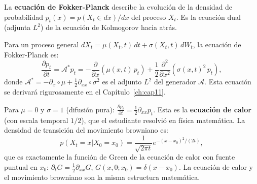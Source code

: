 La \textbf{ecuación de Fokker-Planck} describe la evolución de la densidad
de probabilidad $p_t(x) = p(X_t \in dx)/dx$ del proceso $X_t$. Es la ecuación
dual (adjunta $L^2$) de la ecuación de Kolmogorov hacia atrás.

Para un proceso general $dX_t = \mu(X_t,t)\,dt + \sigma(X_t,t)\,dW_t$,
la ecuación de Fokker-Planck es:
\begin{equation}
  \frac{\partial p_t}{\partial t}
  = \mathcal{A}^* p_t
  = -\frac{\partial}{\partial x}(\mu(x,t)\,p_t)
  + \frac{1}{2}\frac{\partial^2}{\partial x^2}(\sigma(x,t)^2\,p_t),
  \label{eq:fp}
\end{equation}
donde $\mathcal{A}^* = -\partial_x \circ \mu + \frac{1}{2}\partial_{xx}
\circ \sigma^2$ es el adjunto $L^2$ del generador $\mathcal{A}$. Esta
ecuación se derivará rigurosamente en el Capítulo~\ref{ch:cap11}.

Para $\mu = 0$ y $\sigma = 1$ (difusión pura):
$\frac{\partial p_t}{\partial t} = \frac{1}{2}\partial_{xx}p_t$. Esta es la
\textbf{ecuación de calor} (con escala temporal $1/2$), que el estudiante
resolvió en física matemática. La densidad de transición del movimiento
browniano es:
\[
  p(X_t = x | X_0 = x_0) = \frac{1}{\sqrt{2\pi t}}e^{-(x-x_0)^2/(2t)},
\]
que es exactamente la función de Green de la ecuación de calor con
fuente puntual en $x_0$: $\partial_t G = \frac{1}{2}\partial_{xx}G$,
$G(x,0;x_0) = \delta(x-x_0)$. La ecuación de calor y el movimiento browniano
son la misma estructura matemática.

